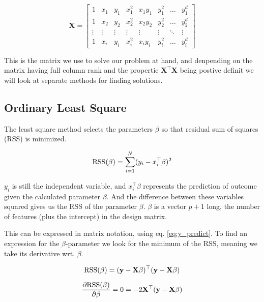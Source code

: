 \documentclass[a4paper,12pt, english]{article}
\begin{document}
\begin{equation}\label{eq:designmatrix}
\mathbf{X} = 
\begin{bmatrix}
1 & x_1 & y_1 & x_1^2 & x_1y_1 & y_1^2 & \dots  & y_1^d \\
1 & x_2 & y_2 & x_2^2 & x_2y_2 & y_2^2 & \dots  & y_2^d \\
\vdots & \vdots & \vdots & \vdots & \vdots & \vdots & \ddots & \vdots \\
1 & x_i & y_i & x_i^2 & x_iy_i & y_i^2 & \dots  & y_i^d
\end{bmatrix}
\end{equation}

This is the matrix we use to solve our problem at hand, and denpending on the matrix having full column rank and the propertie $\mathbf{X^{\top}}\mathbf{X}$ being postive definit we will look at separate methods for finding solutions.

\subsection*{Ordinary Least Square}

The least square method selects the parameters $\beta$ so that residual sum of squares (RSS) is minimized.

\begin{equation}
\textnormal{RSS}(\beta) = \sum_{i=1}^{N} (y_i - x_i^{\top}\beta)^2
\end{equation}

$y_i$ is still the independent variable, and $x_i^{\top}\beta$ represents the prediction of outcome given the calculated parameter $\beta$. And the difference between these variables squared gives us the RSS of the parameter $\beta$. $\beta$ is a vector $p + 1$ long, the number of features (plus the intercept) in the design matrix. 

This can be expressed in matrix notation, using eq. \ref{eq:y_predict}. To find an expression for the $\beta$-parameter we look for the minimum of the RSS, meaning we take its derivative wrt. $\beta$.

\begin{equation}
\textnormal{RSS}(\beta) = (\mathbf{y} - \mathbf{X}\beta)^{\top}(\mathbf{y} - \mathbf{X}\beta)
\end{equation}

\begin{equation}
\frac{\partial \textnormal{RSS}(\beta)}{\partial \beta} = 0 = -2 \mathbf{X}^{\top}(\mathbf{y} - \mathbf{X}\beta)
\end{equation}
\end{document}
